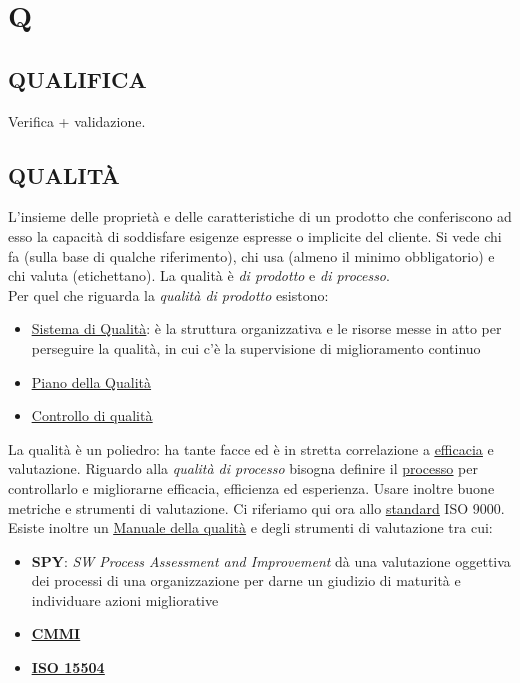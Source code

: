 \newpage
	\section{Q} \label{sec:Q}

		\subsection{QUALIFICA}  \label{qualifica}
		Verifica + validazione.

		\subsection{QUALITÀ}  \label{qualita} %
		L’insieme delle proprietà e delle caratteristiche di un prodotto che conferiscono ad esso la capacità di soddisfare esigenze espresse o implicite del cliente.
		Si vede chi fa (sulla base di qualche riferimento), chi usa (almeno il minimo obbligatorio) e chi valuta (etichettano).
		La qualità è \textit{di prodotto} e \textit{di processo}.\\
		Per quel che riguarda la \textit{qualità di prodotto} esistono:
		\begin{itemize}
			\item \underline{\hyperref[sistemadiqualita]{Sistema di Qualità}}: è la struttura organizzativa e le risorse messe in atto per perseguire la qualità, in cui c'è la supervisione di miglioramento continuo
			\item \underline{\hyperref[pianoqualifica]{Piano della Qualità}}
			\item \underline{\hyperref[controlloqualita]{Controllo di qualità}}
		\end{itemize}
		La qualità è un poliedro: ha tante facce ed è in stretta correlazione a \underline{\hyperref[efficacia]{efficacia}} e valutazione.
		Riguardo alla \textit{qualità di processo} bisogna definire il \underline{\hyperref[processo]{processo}} per controllarlo e migliorarne efficacia, efficienza ed esperienza. Usare inoltre buone metriche e strumenti di valutazione. Ci riferiamo qui ora allo \underline{\hyperref[standard]{standard}} ISO 9000. \\
		Esiste inoltre un \underline{\hyperref[manualequalita]{Manuale della qualità}} e degli strumenti di valutazione tra cui:
		\begin{itemize}
			\item \textbf{SPY}: \textit{SW Process Assessment and Improvement} dà una valutazione oggettiva dei processi di una organizzazione per darne un giudizio di maturità e individuare azioni migliorative
			\item \textbf{\underline{\hyperref[cmmi]{CMMI}}}
			\item \textbf{\underline{\hyperref[15504]{ISO 15504}}}
		\end{itemize}
